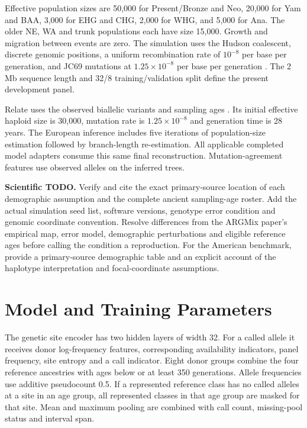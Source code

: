 \documentclass[letterpaper]{article}
\newcommand{\todo}[1]{\par\noindent\textbf{Scientific TODO.} #1\par}
\begin{document}
Effective population sizes are 50,000 for Present/Bronze and Neo, 20,000 for Yam and BAA, 3,000 for EHG and CHG, 2,000 for WHG, and 5,000 for Ana. The older NE, WA and trunk populations each have size 15,000. Growth and migration between events are zero. The simulation uses the Hudson coalescent, discrete genomic positions, a uniform recombination rate of $10^{-8}$ per base per generation, and JC69 mutations at $1.25\times10^{-8}$ per base per generation \citep{msprime2022}. The 2\,Mb sequence length and 32/8 training/validation split define the present development panel.

Relate uses the observed biallelic variants and sampling ages \citep{relate2019}. Its initial effective haploid size is 30,000, mutation rate is $1.25\times10^{-8}$ and generation time is 28 years. The European inference includes five iterations of population-size estimation followed by branch-length re-estimation. All applicable completed model adapters consume this same final reconstruction. Mutation-agreement features use observed alleles on the inferred trees.

\todo{Verify and cite the exact primary-source location of each demographic assumption and the complete ancient sampling-age roster. Add the actual simulation seed list, software versions, genotype error condition and genomic coordinate convention. Resolve differences from the ARGMix paper's empirical map, error model, demographic perturbations and eligible reference ages before calling the condition a reproduction. For the American benchmark, provide a primary-source demographic table and an explicit account of the haplotype interpretation and focal-coordinate assumptions.}

\section{Model and Training Parameters}
\label{app:training}
The genetic site encoder has two hidden layers of width 32. For a called allele it receives donor log-frequency features, corresponding availability indicators, panel frequency, site entropy and a call indicator. Eight donor groups combine the four reference ancestries with ages below or at least 350 generations. Allele frequencies use additive pseudocount 0.5. If a represented reference class has no called alleles at a site in an age group, all represented classes in that age group are masked for that site. Mean and maximum pooling are combined with call count, missing-pool status and interval span.
\end{document}
